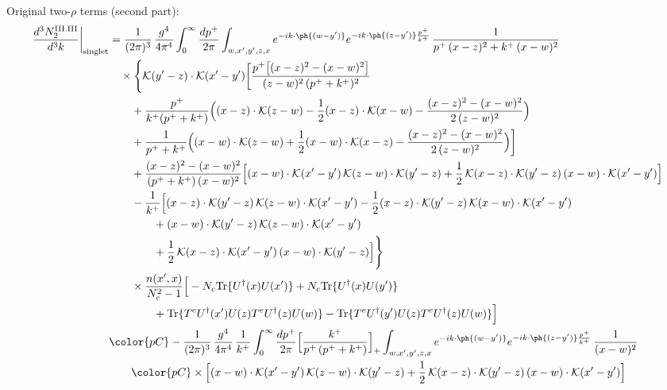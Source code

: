 Original two-$\rho$ terms (second part):
\begin{align}
\frac{d^{3}N^{\rm III.III}_{2}}{d^{3}k}\bigg|_{\rm singlet} & =\frac{1}{(2\pi)^{3}}\,\frac{g^{4}}{4\pi^{4}}\int_{0}^{\infty}\frac{dp^{+}}{2\pi}\int_{w,x',y',z,x}e^{-ik\cdot\ph{(w-y')}}e^{-ik\cdot\ph{(z-y')}\frac{p^{+}}{k^{+}}}\,\frac{1}{p^{+}\,(x-z)^{2}+k^{+}\,(x-w)^{2}}\notag\\
&\quad\times\Bigg\{\mathcal{K}(y'-z)\cdot\mathcal{K}(x'-y')\bigg[\frac{p^{+}\big[(x-z)^{2}-(x-w)^{2}\big]}{(z-w)^{2}\,(p^{+}+k^{+})^{2}}\notag\\
&\qquad+\frac{p^{+}}{k^{+}(p^{+}+k^{+})}\Big((x-z)\cdot\mathcal{K}(z-w)-\frac{1}{2}(x-z)\cdot\mathcal{K}(x-w)-\frac{(x-z)^{2}-(x-w)^{2}}{2\,(z-w)^{2}}\Big)\notag\\
&\qquad+\frac{1}{p^{+}+k^{+}}\Big((x-w)\cdot\mathcal{K}(z-w)+\frac{1}{2}(x-w)\cdot\mathcal{K}(x-z)-\frac{(x-z)^{2}-(x-w)^{2}}{2\,(z-w)^{2}}\Big)\bigg]\notag\\
&\qquad+\frac{(x-z)^{2}-(x-w)^{2}}{(p^{+}+k^{+})\,(x-w)^{2}}\Big[(x-w)\cdot\mathcal{K}(x'-y')\,\mathcal{K}(z-w)\cdot\mathcal{K}(y'-z)+\frac{1}{2}\,\mathcal{K}(x-z)\cdot\mathcal{K}(y'-z)\,(x-w)\cdot\mathcal{K}(x'-y')\Big]\notag\\
&\qquad-\frac{1}{k^{+}}\Big[(x-z)\cdot\mathcal{K}(y'-z)\,\mathcal{K}(z-w)\cdot\mathcal{K}(x'-y')-\frac{1}{2}(x-z)\cdot\mathcal{K}(y'-z)\,\mathcal{K}(x-w)\cdot\mathcal{K}(x'-y')\notag\\
&\qquad\qquad+(x-w)\cdot\mathcal{K}(y'-z)\,\mathcal{K}(z-w)\cdot\mathcal{K}(x'-y')\notag\\
&\qquad\qquad+\frac{1}{2}\,\mathcal{K}(x-z)\cdot\mathcal{K}(x'-y')\,(x-w)\cdot\mathcal{K}(y'-z)\Big]\Bigg\}\notag\\
&\qquad\times\frac{n(x',x)}{N_{c}^{2}-1}\Big[-N_{c}{\rm Tr}\{U^{\dagger}(x)U(x')\}+N_{c}{\rm Tr}\{U^{\dagger}(x)U(y')\}\notag\\ &\qquad\qquad+{\rm Tr}\{T^{e}U^{\dagger}(x')U(z)T^{e}U^{\dagger}(z)U(w)\}-{\rm Tr}\{T^{e}U^{\dagger}(y')U(z)T^{e}U^{\dagger}(z)U(w)\}\Big]\notag\\
&{\color{pC}-\frac{1}{(2\pi)^{3}}\,\frac{g^{4}}{4\pi^{4}}\,\frac{1}{k^{+}}\int_{0}^{\infty}\frac{dp^{+}}{2\pi}\Big[\frac{k^{+}}{p^{+}\,(p^{+}+k^{+})}\Big]_{+}\int_{w,x',y',z,x}e^{-ik\cdot\ph{(w-y')}}e^{-ik\cdot\ph{(z-y')}\frac{p^{+}}{k^{+}}}\,\frac{1}{(x-w)^{2}}}\notag\\
&\qquad{\color{pC}\times\Big[(x-w)\cdot\mathcal{K}(x'-y')\,\mathcal{K}(z-w)\cdot\mathcal{K}(y'-z)+\frac{1}{2}\,\mathcal{K}(x-z)\cdot\mathcal{K}(y'-z)\,(x-w)\cdot\mathcal{K}(x'-y')\Big]}\notag\\

\end{align}
